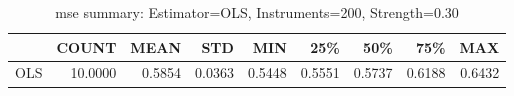 \begin{table}[ht]
\centering
\caption{mse summary: Estimator=OLS, Instruments=200, Strength=0.30}
\begin{tabular}{lrrrrrrrr}
\toprule
 & COUNT & MEAN & STD & MIN & 25\% & 50\% & 75\% & MAX \\
\midrule
OLS & 10.0000 & 0.5854 & 0.0363 & 0.5448 & 0.5551 & 0.5737 & 0.6188 & 0.6432 \\
\bottomrule
\end{tabular}
\end{table}
